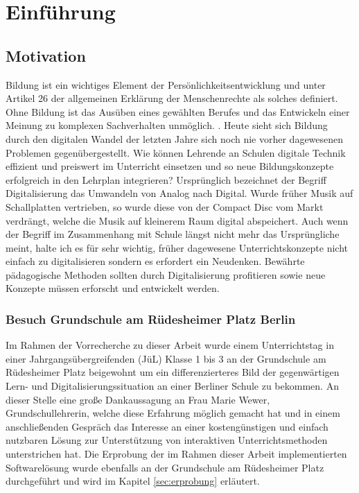 \section{Einführung}\label{sec:einfuhrung}
\subsection{Motivation}\label{sec:motivation}

Bildung ist ein wichtiges Element der Persönlichkeitsentwicklung und unter Artikel 26 der allgemeinen Erklärung der Menschenrechte als solches definiert. Ohne Bildung ist das Ausüben eines gewählten Berufes und das Entwickeln einer Meinung zu komplexen Sachverhalten unmöglich. \cite{weitblicker.org2019:online}. Heute sieht sich Bildung durch den digitalen Wandel der letzten Jahre sich noch nie vorher dagewesenen Problemen gegenübergestellt. Wie können Lehrende an Schulen digitale Technik effizient und preiswert im Unterricht einsetzen und so neue Bildungskonzepte erfolgreich in den Lehrplan integrieren? Ursprünglich bezeichnet der Begriff Digitalisierung das Umwandeln von Analog nach Digital. Wurde früher Musik auf Schallplatten vertrieben, so wurde diese von der Compact Disc vom Markt verdrängt, welche die Musik auf kleinerem Raum digital abspeichert. Auch wenn der Begriff im Zusammenhang mit Schule längst nicht mehr das Ursprüngliche meint, halte ich es für sehr wichtig, früher dagewesene Unterrichtskonzepte nicht einfach zu digitalisieren sondern es erfordert ein Neudenken. Bewährte pädagogische Methoden sollten durch Digitalisierung profitieren sowie neue Konzepte müssen erforscht und entwickelt werden. 

\subsubsection{Besuch Grundschule am Rüdesheimer Platz Berlin}\label{sec:grundschulebesuch}
Im Rahmen der Vorrecherche zu dieser Arbeit wurde einem Unterrichtstag in 
einer Jahrgangsübergreifenden (JüL) Klasse 1 bis 3 an der Grundschule am Rüdesheimer Platz beigewohnt um ein differenzierteres 
Bild der gegenwärtigen Lern- und Digitalisierungssituation an einer Berliner Schule zu bekommen. An dieser Stelle eine große Dankaussagung an Frau Marie Wewer, Grundschullehrerin, welche diese Erfahrung möglich gemacht hat und in einem anschließenden Gespräch das Interesse an einer kostengünstigen und einfach nutzbaren Lösung zur Unterstützung von interaktiven Unterrichtsmethoden unterstrichen hat. Die Erprobung der im Rahmen dieser Arbeit implementierten Softwarelösung wurde ebenfalls an der Grundschule am Rüdesheimer Platz durchgeführt und wird im Kapitel \ref{sec:erprobung} erläutert.  
\newpage
